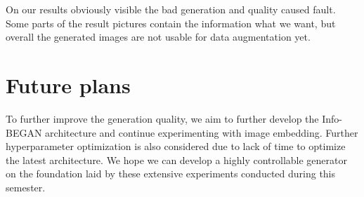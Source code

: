 \documentclass{egpubl}
\begin{document}
On our results obviously visible the bad generation and quality caused fault. %
Some parts of the result pictures contain the information what we want, but overall the generated images are not usable for data augmentation yet.

\section{Future plans}
To further improve the generation quality, we aim to further develop the Info-BEGAN architecture and continue experimenting with image embedding. Further hyperparameter optimization is also considered due to lack of time to optimize the latest architecture. We hope we can develop a highly controllable generator on the foundation laid by these extensive experiments conducted during this semester.
\end{document}
